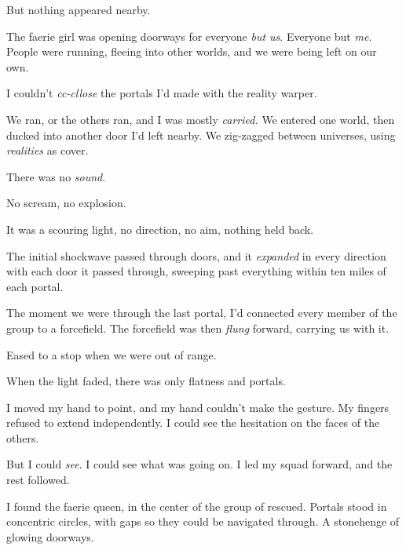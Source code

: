 But nothing appeared nearby.



The faerie girl was opening doorways for everyone \emph{but us}.  Everyone but \emph{me}.  People were running, fleeing into other worlds, and we were being left on our own.



I couldn't \emph{cc-cllose} the portals I'd made with the reality warper.



We ran, or the others ran, and I was mostly \emph{carried.}  We entered one world, then ducked into another door I'd left nearby.  We zig-zagged between universes, using \emph{realities} as cover.



There was no \emph{sound}.



No scream, no explosion.



It was a scouring light, no direction, no aim, nothing held back.



The initial shockwave passed through doors, and it \emph{expanded} in every direction with each door it passed through, sweeping past everything within ten miles of each portal.



The moment we were through the last portal, I'd connected every member of the group to a forcefield.  The forcefield was then \emph{flung} forward, carrying us with it.



Eased to a stop when we were out of range.



When the light faded, there was only flatness and portals.



I moved my hand to point, and my hand couldn't make the gesture.  My fingers refused to extend independently.  I could see the hesitation on the faces of the others.



But I could \emph{see}.  I could see what was going on.  I led my squad forward, and the rest followed.



I found the faerie queen, in the center of the group of rescued.  Portals stood in concentric circles, with gaps so they could be navigated through.  A stonehenge of glowing doorways.



